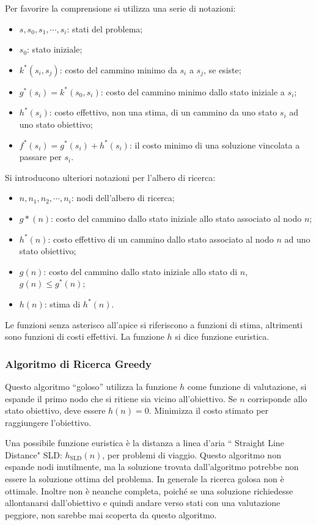 \documentclass{article}
\numberwithin{equation}{subsection}
\begin{document}
Per favorire la comprensione si utilizza una serie di notazioni:
\begin{itemize}
    \item $s,s_0,s_1,\cdots,s_i$: stati del problema;
    \item $s_0$: stato iniziale;
    \item $k^*(s_i,s_j)$: costo del cammino minimo da $s_i$ a $s_j$, se esiste;
    \item $g^*(s_i)=k^*(s_0,s_i)$: costo del cammino minimo dallo stato iniziale a $s_i$;
    \item $h^*(s_i)$: costo effettivo, non una stima, di un cammino da uno stato $s_i$ ad uno stato obiettivo;
    \item $f^*(s_i)=g^*(s_i)+h^*(s_i)$: il costo minimo di una soluzione vincolata a passare per $s_i$. 
\end{itemize}
Si introducono ulteriori notazioni per l'albero di ricerca:
\begin{itemize}
    \item $n,n_1,n_2,\cdots,n_i$: nodi dell'albero di ricerca;
    \item $g*(n)$: costo del cammino dallo stato iniziale allo stato associato al nodo $n$;
    \item $h^*(n)$: costo effettivo di un cammino dallo stato associato al nodo $n$ ad uno stato obiettivo;
    \item $g(n)$: costo del cammino dallo stato iniziale allo stato di $n$, $g(n)\leq g^*(n)$;
    \item $h(n)$: stima di $h^*(n)$. 
\end{itemize}

Le funzioni senza asterisco all'apice si riferiscono a funzioni di stima, altrimenti sono funzioni di costi effettivi. La funzione $h$ si dice funzione euristica. 

\subsubsection{Algoritmo di Ricerca Greedy}

Questo algoritmo ``goloso'' utilizza la funzione $h$ come funzione di valutazione, si espande il primo nodo che si ritiene sia vicino all'obiettivo. Se $n$ 
corrisponde allo stato obiettivo, deve essere $h(n)=0$. Minimizza il costo stimato per raggiungere l'obiettivo. 

Una possibile funzione euristica è la distanza a linea d'aria `` Straight Line Distance" SLD: $h_{\mathrm{SLD}}(n)$, per problemi di viaggio. Questo algoritmo non 
espande nodi inutilmente, ma la soluzione trovata dall'algoritmo potrebbe non essere la soluzione ottima del problema. In generale la ricerca golosa non è 
ottimale. Inoltre non è neanche completa, poiché se una soluzione richiedesse allontanarsi dall'obiettivo e quindi andare verso stati con una valutazione peggiore, non 
sarebbe mai scoperta da questo algoritmo. 
\end{document}

